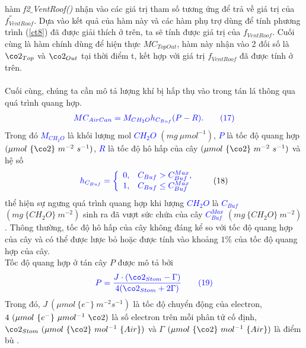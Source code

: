 \documentclass[13pt,a4paper]{article}
\begin{document}
			hàm \textit{f2$\_$VentRoof()} nhận vào các giá trị tham số tương ứng để trả về giá trị của $f^{''}_{VentRoof}$. Dựa vào kết quả của hàm này và các hàm  phụ trợ dùng để tính phương trình (\ref{ct8}) đã được giải thích ở trên, ta sẽ tính được giá trị của $f_{VentRoof}$. Cuối cùng là hàm chính dùng để hiện thực $MC_{TopOut}$, hàm này nhận vào 2 đối số là $\co2_{Top}$ và $\co2_{Out}$ tại thời điểm t, kết hợp với giá trị $f_{VentRoof}$ đã được tính ở trên. \\ \\
			
			Cuối cùng, chúng ta cần mô tả lượng khí  bị hấp thụ vào trong tán lá thông qua quá trình quang hợp.
			\begin{align}
				\color{blue}
				MC_{AirCan} = M_{CH_2O}h_{C_{Buf}}(P - R).
				\color{blue}
				\tag{17} \label{ct17}
			\end{align}
			Trong đó \textcolor{blue}{$M_{CH_2O}$} là khối lượng mol \textcolor{blue}{$CH_2O$} $(mg\ \mu mol^{-1})$, \textcolor{blue}{$P$} là tốc độ quang hợp $(\mu mol\ \{\co2\}\ m^{-2}\ s^{-1})$, \textcolor{blue}{$R$} là tốc độ hô hấp của cây $(\mu mol\ \{\co2\}\ m^{-2}\ s^{-1})$ và hệ số
			\begin{align}
				\textcolor{blue}{h_{C_{Buf}} = \left\{\begin{array}{lll}
						0, & C_{Buf} > C^{Max}_{Buf}, \\
						1, & C_{Buf} \leq C^{Max}_{Buf}
					\end{array}\right.}
				\tag{18} \label{ct18}
			\end{align}
			thể hiện sự ngưng quá trình quang hợp khi lượng \textcolor{blue}{$CH_2O$} là \textcolor{blue}{$C_{Buf}$} $(mg\ \{CH_2O\}\ m^{-2})$ sinh ra đã vượt sức chứa của cây \textcolor{blue}{$C^{Max}_{Buf}$} $(mg\ \{CH_2O\}\ m^{-2})$. Thông thường, tốc độ hô hấp của cây không đáng kể so với tốc độ quang hợp của cây và có thể được lược bỏ hoặc được tính vào khoảng $1\%$ của tốc độ quang hợp của cây. \\
			Tốc độ quang hợp ở tán cây $P$ được mô tả bởi
			\begin{align}
				\color{blue}
					P = \dfrac{J \cdot (\co2_{Stom} - \Gamma)}{4(\co2_{Stom} + 2\Gamma)}
				\color{blue}
				\tag{19} \label{ct19}
			\end{align}
			Trong đó, $J\ (\mu mol\ \{e^{-}\}\ m^{-2}s^{-1})$ là tốc độ chuyển động của electron, $4\ (\mu mol\ \{e^{-}\}\ \mu mol^{-1}\ {\co2})$ là số electron trên mỗi phân tử \co2 cố định, $_{Stom}\ (\mu mol\ \{\}\ mol^{-1}\ \{Air\})$ và $\Gamma$ $(\mu mol\ \{\co2\}\ mol^{-1}\ \{Air\})$ là điểm bù \co2.\\
\end{document}

